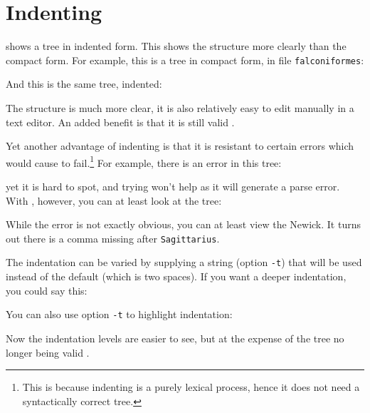 
\section{Indenting}
\label{sct_indent}

\nwindent{} shows a \nw{} tree in indented form. This shows the structure more
clearly than the compact form. For example, this is a tree in compact form, in
file \texttt{falconiformes}:

And this is the same tree, indented:


The structure is much more clear, it is also relatively easy to edit manually
in a text editor. An added benefit is that it is still valid \nw. 

Yet another advantage of indenting is that it is resistant to certain errors
which would cause \display{} to fail.\footnote{This is
because indenting is a purely lexical process, hence it does not need a
syntactically correct tree.} For example, there is an error in this tree:

yet it is hard to spot, and trying \display{} won't help as it will generate a
parse error. With \nwindent{}, however, you can at least look at the tree:

While the error is not exactly obvious, you can at least view the Newick. It turns out there is a comma missing after \texttt{Sagittarius}.

The indentation can be varied by supplying a string (option \texttt{-t}) that
will be used instead of the default (which is two spaces). If you want a deeper
indentation, you could say this:


You can also use option \texttt{-t} to highlight indentation:


Now the indentation levels are easier to see, but at the expense of the tree no
longer being valid \nw.




